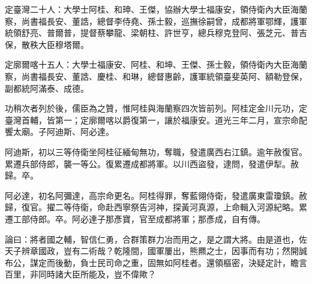 \begin{pinyinscope}
定臺灣二十人：大學士阿桂、和珅、王傑，協辦大學士福康安，領侍衛內大臣海蘭察，尚書福長安、董誥，總督李侍堯、孫士毅，巡撫徐嗣曾，成都將軍鄂輝，護軍統領舒亮、普爾普，提督蔡攀龍、梁朝柱、許世亨，總兵穆克登阿、張芝元、普吉保，散秩大臣穆塔爾。

定廓爾喀十五人：大學士福康安、阿桂、和坤、王傑、孫士毅，領侍衛內大臣海蘭察，尚書福長安、董誥、慶桂、和琳，總督惠齡，護軍統領臺斐英阿、額勒登保，副都統阿滿泰、成德。

功稍次者列於後，儒臣為之贊，惟阿桂與海蘭察四次皆前列。阿桂定金川元功，定臺灣首輔，皆第一；定廓爾喀以爵復第一，讓於福康安。道光三年二月，宣宗命配饗太廟。子阿迪斯、阿必達。

阿迪斯，初以三等侍衛坐阿桂征緬甸無功，奪職，發遣廣西右江鎮。逾年赦復官。累遷兵部侍郎，襲一等公。復累遷成都將軍。以川西盜發，逮問，發遣伊犁。赦歸。卒。

阿必達，初名阿彌達，高宗命更名。阿桂得罪，奪藍翎侍衛，發遣廣東雷瓊鎮。赦歸，復官。擢二等侍衛，命赴西寧祭告河神，探黃河真源，上命輯入河源紀略。累遷工部侍郎。卒。阿必達子那彥寶，官至成都將軍；那彥成，自有傳。

論曰：將者國之輔，智信仁勇，合群策群力冶而用之，是之謂大將。由是道也，佐天子辨章國政，豈有二術哉？乾隆間，國軍屢出，熊羆之士，因事而有功；然開誠布公，謀定而後動，負士民司命之重，固無如阿桂者。還領樞密，決疑定計，瞻言百里，非同時諸大臣所能及，豈不偉歟？


\end{pinyinscope}